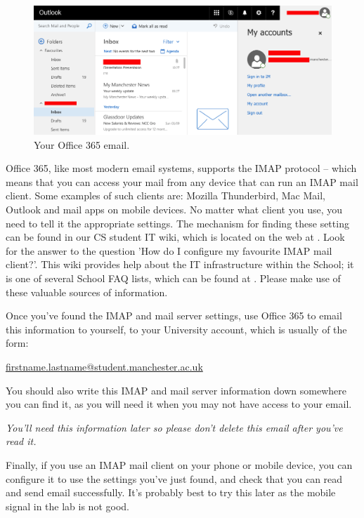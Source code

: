 \begin{figure}
\centerline{\includegraphics[width=15cm]{images/Office365-AY17}}
\caption{Your Office 365 email.}
\label{figure:welc-mail365}
\end{figure}

\label{sec:reading-your-mail}

Office 365, like most modern email systems, supports the IMAP protocol
-- which means that you can access your mail from any device that can
run an IMAP mail client. Some examples of such clients are: Mozilla
Thunderbird, Mac Mail, Outlook and mail apps on mobile devices. No
matter what client you use, you need to tell it the appropriate
settings. The mechanism for finding these setting can be found in our
CS student IT wiki, which is located on the web at
. Look for
the answer to the question 'How do I configure my favourite IMAP mail
client?'. This wiki provides help about the IT infrastructure within
the School; it is one of several School FAQ lists, which can be found
at . Please make
use of these valuable sources of information.

Once you've found the IMAP and mail server settings, use Office 365 to email this information to yourself, to your
University account, which is usually of the form:

\url{firstname.lastname@student.manchester.ac.uk}

You should also write this IMAP and mail server information down somewhere you can find it, as you will need it   when you may not have access to your email.

\enlargethispage{\baselineskip}
\emph{You'll need this information later so please don't delete this email after you've read it.}


Finally, if you use an IMAP mail client on your phone or mobile
device, you can configure it to use the settings you've just found, and check
that you can read and send email successfully. It's probably best to try this later as the mobile signal in the lab is not good.

